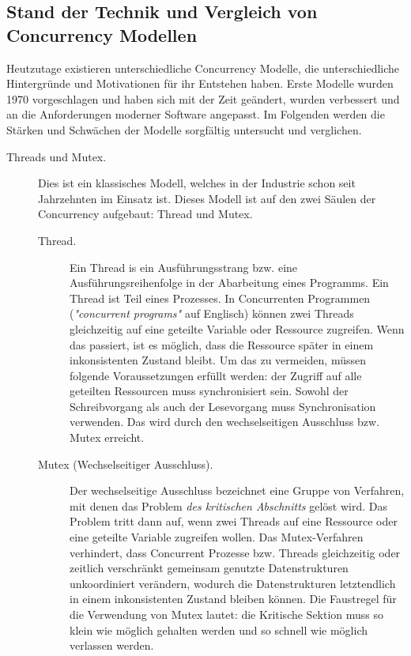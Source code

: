 \subsection{Stand der Technik und Vergleich von Concurrency Modellen}

Heutzutage existieren unterschiedliche Concurrency Modelle, die unterschiedliche Hintergründe und Motivationen für ihr Entstehen haben. Erste Modelle wurden 1970 vorgeschlagen und haben sich mit der Zeit geändert, wurden verbessert und an die Anforderungen moderner Software angepasst. Im Folgenden werden die Stärken und Schwächen der Modelle sorgfältig untersucht und verglichen.

\begin{description} 
	\item[Threads und Mutex.] Dies ist ein klassisches Modell, welches in der Industrie schon seit Jahrzehnten im Einsatz ist. Dieses Modell ist auf den zwei Säulen der Concurrency aufgebaut: Thread und Mutex.
	
	\begin{description} 
		\item[Thread.] Ein Thread is ein Ausführungsstrang bzw. eine Ausführungsreihenfolge in der Abarbeitung eines Programms. Ein Thread ist Teil eines Prozesses. In Concurrenten Programmen (\textit{"concurrent programs"} auf Englisch) können zwei Threads gleichzeitig auf eine geteilte Variable oder Ressource zugreifen. Wenn das passiert, ist es möglich, dass die Ressource später in einem inkonsistenten Zustand bleibt. Um das zu vermeiden, müssen folgende Voraussetzungen erfüllt werden: der Zugriff auf alle geteilten Ressourcen muss synchronisiert sein. Sowohl der Schreibvorgang als auch der Lesevorgang muss Synchronisation verwenden. Das wird durch den wechselseitigen Ausschluss bzw. Mutex erreicht.
		
		\item[Mutex (Wechselseitiger Ausschluss).] Der wechselseitige Ausschluss bezeichnet eine Gruppe von Verfahren, mit denen das Problem \textit{des kritischen Abschnitts} gelöst wird. Das Problem tritt dann auf, wenn zwei Threads auf eine Ressource oder eine geteilte Variable zugreifen wollen. Das Mutex-Verfahren verhindert, dass Concurrent Prozesse bzw. Threads gleichzeitig oder zeitlich verschränkt gemeinsam genutzte Datenstrukturen unkoordiniert verändern, wodurch die Datenstrukturen letztendlich in einem inkonsistenten Zustand bleiben können. Die Faustregel für die Verwendung von Mutex lautet: die Kritische Sektion muss so klein wie möglich gehalten werden und so schnell wie möglich verlassen werden.	
	\end{description}
	

\end{description}

